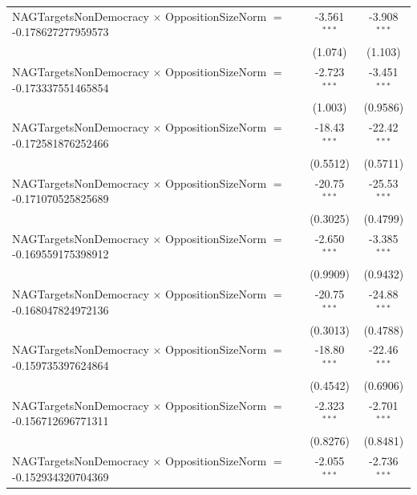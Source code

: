\begin{tabular}{lcc}
   NAGTargetsNonDemocracy $\times$ OppositionSizeNorm $=$ -0.178627277959573    & -3.561$^{***}$       & -3.908$^{***}$\\   
                                                                                & (1.074)              & (1.103)\\   
   NAGTargetsNonDemocracy $\times$ OppositionSizeNorm $=$ -0.173337551465854    & -2.723$^{***}$       & -3.451$^{***}$\\   
                                                                                & (1.003)              & (0.9586)\\   
   NAGTargetsNonDemocracy $\times$ OppositionSizeNorm $=$ -0.172581876252466    & -18.43$^{***}$       & -22.42$^{***}$\\   
                                                                                & (0.5512)             & (0.5711)\\   
   NAGTargetsNonDemocracy $\times$ OppositionSizeNorm $=$ -0.171070525825689    & -20.75$^{***}$       & -25.53$^{***}$\\   
                                                                                & (0.3025)             & (0.4799)\\   
   NAGTargetsNonDemocracy $\times$ OppositionSizeNorm $=$ -0.169559175398912    & -2.650$^{***}$       & -3.385$^{***}$\\   
                                                                                & (0.9909)             & (0.9432)\\   
   NAGTargetsNonDemocracy $\times$ OppositionSizeNorm $=$ -0.168047824972136    & -20.75$^{***}$       & -24.88$^{***}$\\   
                                                                                & (0.3013)             & (0.4788)\\   
   NAGTargetsNonDemocracy $\times$ OppositionSizeNorm $=$ -0.159735397624864    & -18.80$^{***}$       & -22.46$^{***}$\\   
                                                                                & (0.4542)             & (0.6906)\\   
   NAGTargetsNonDemocracy $\times$ OppositionSizeNorm $=$ -0.156712696771311    & -2.323$^{***}$       & -2.701$^{***}$\\   
                                                                                & (0.8276)             & (0.8481)\\   
   NAGTargetsNonDemocracy $\times$ OppositionSizeNorm $=$ -0.152934320704369    & -2.055$^{***}$       & -2.736$^{***}$\\   

\end{tabular}
